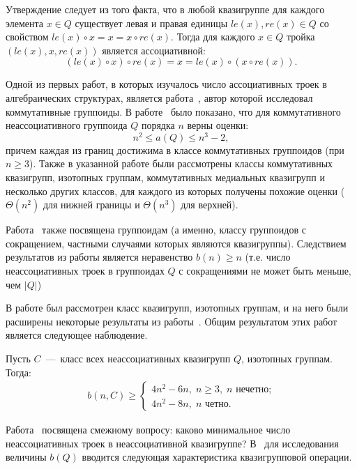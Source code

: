     Утверждение следует из того факта, что в любой квазигруппе для каждого элемента $x \in Q$ существует левая и правая единицы $le(x), re(x) \in Q$ со свойством $le(x) \circ x = x = x \circ re(x)$. 
    Тогда для каждого $x \in Q$ тройка $(le(x), x, re(x))$ является ассоциативной: 
    \[
        (le(x) \circ x) \circ re(x) 
        = x = le(x) \circ (x \circ re(x)).
    \] 

    Одной из первых работ, в которых изучалось число ассоциативных троек в алгебраических структурах, является работа~\cite{kepka1981notes}, автор которой исследовал коммутативные группоиды.
    В работе~\cite{kepka1981notes} было показано, что для коммутативного неассоциативного группоида $Q$ порядка $n$ верны оценки:
    \[
        n^2 \le a(Q) \le n^3 - 2,
    \]
    причем каждая из границ достижима в классе коммутативных группоидов (при $n \ge 3$).
    Также в указанной работе были рассмотрены классы коммутативных квазигрупп, изотопных группам, коммутативных медиальных квазигрупп и несколько других классов, для каждого из которых получены похожие оценки ($\Theta(n^2)$ для нижней границы и $\Theta(n^3)$ для верхней).

    Работа~\cite{kepka1980note} также посвящена группоидам (а именно, классу группоидов с сокращением, частными случаями
    которых являются квазигруппы).
    Следствием результатов из работы \cite{kepka1980note} является неравенство $b(n) \ge n$ (т.е. число неассоциативных троек в группоидах $Q$ с сокращениями не может быть меньше, чем $\lvert Q \rvert$)

    В работе \cite{drapal1981note} был рассмотрен класс квазигрупп, изотопных группам, и на него были расширены некоторые результаты из работы~\cite{kepka1981notes}.
    Общим результатом этих работ является следующее наблюдение.
    \begin{proposition}
        Пусть $C$~---~класс всех неассоциативных квазигрупп $Q$, изотопных группам.
        Тогда:
        \begin{gather*}
            b(n, C) \ge 
            \begin{cases}
                4n^2 - 6n, \; n \ge 3, \; n \text{ нечетно;} \\
                4n^2 - 8n, \; n \text{ четно.}
            \end{cases}
        \end{gather*}
    \end{proposition}

    Работа~\cite{drapal1983quasigroups} посвящена смежному вопросу: каково минимальное число неассоциативных троек в неассоциативной квазигруппе?
    В~\cite{drapal1983quasigroups} для исследования величины $b(Q)$ вводится следующая характеристика квазигрупповой операции.

